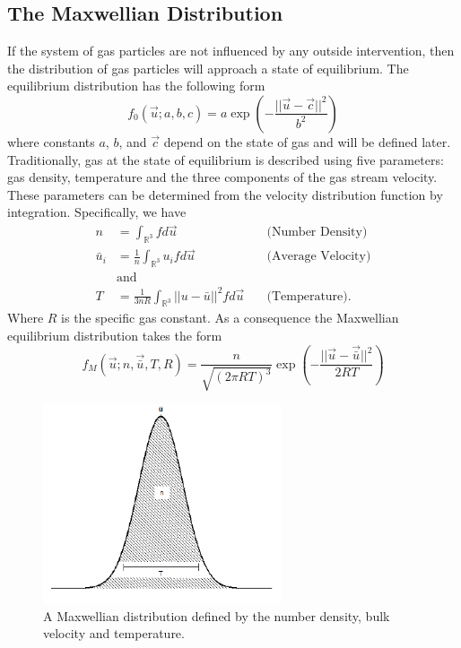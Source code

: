 \subsection{The Maxwellian Distribution}
If the system of gas particles are not influenced by any outside intervention, then the distribution of gas particles will approach a state of equilibrium. The equilibrium distribution has the following form
%
\begin{equation}
\label{theDist}
f_0(\vec{u}; a,b,c) = a  \exp{\left(-\frac{||\vec{u} - \vec{c}||^2}{b^2}\right)}
\end{equation}
%
where constants $a$, $b$, and $\vec{c}$ depend on the state of gas and will be defined later. Traditionally, gas at the state of equilibrium is described using five parameters: gas density, temperature and the three components of the gas stream velocity. These parameters can be determined from the velocity distribution function by integration. Specifically, we have 
%
\begin{align*}
n &= \int_{\mathbb{R}^3} f d\vec{u} \quad &\text{(Number Density)}\\
\bar{u}_i &= \frac{1}{n} \int_{\mathbb{R}^3} u_i f d\vec{u} \quad &\text{(Average Velocity)}\\
&\text{and}\\
T &= \frac{1}{3 n R} \int_{\mathbb{R}^3} ||u - \bar{u}||^2 f d\vec{u} \quad &\text{(Temperature)}.
\end{align*}
%
Where $R$ is the specific gas constant. As a consequence the Maxwellian equilibrium distribution takes the form
%
\begin{equation*}
f_M(\vec{u};n,\vec{\bar{u}},T,R) = \frac{n}{\sqrt{(2 \pi R T)^3}}  \exp{\left(-\frac{||\vec{u} - \vec{\bar{u}}||^2}{2 R T}\right)}
\end{equation*}
%
\begin{figure}[h!]
  \centering
      \includegraphics[angle=0,width=70mm]{Boltzmann/Maxwellian.pdf}
  \caption{\label{Max_fig}A Maxwellian distribution defined by the number density, bulk velocity and temperature.}
\end{figure}
